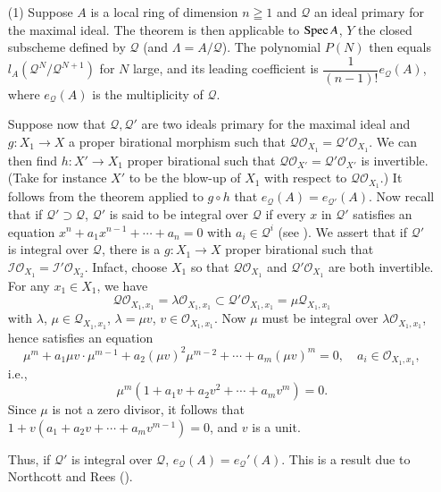 \begin{remarks*}
\begin{itemize}
\item[(1)] Suppose $A$ is a local ring of dimension $n \geqq 1$ and $\mathscr{Q}$ an ideal primary for the maximal ideal. The theorem is then applicable to $\operatorname{Spec} A$, $Y$ the closed subscheme defined by $\mathscr{Q}$ (and $\Lambda = A / \mathscr{Q}$). The polynomial $P(N)$ then equals $l_A (\mathscr{Q}^N / \mathscr{Q}^{N+1})$ for $N$ large, and its leading coefficient is $\dfrac{1}{(n-1)!} e_{\mathscr{Q}} (A)$, where $e_\mathscr{Q}(A)$ is the multiplicity of $\mathscr{Q}$.

Suppose now that $\mathscr{Q}, \mathscr{Q}'$ are two ideals primary for the maximal ideal and $g: X_1 \to X$ a proper birational morphism such that $\mathscr{Q}\mathscr{O}_{X_1} = \mathscr{Q}' \mathscr{O}_{X_1}$. We can then find $h: X' \to X_1$ proper birational such that $\mathscr{Q} \mathscr{O}_{X'} = \mathscr{Q}' \mathscr{O}_{X'}$ is invertible. (Take for instance $X'$ to be the blow-up of $X_1$ with respect to $\mathscr{Q} \mathscr{O}_{X_1}$.) It follows from the theorem applied to $g \circ h$ that $e_\mathscr{Q} (A) = e_{\mathscr{Q}'} (A)$. Now recall that if $\mathscr{Q}' \supset \mathscr{Q}$, $\mathscr{Q}'$ is said to be integral over $\mathscr{Q}$ if every $x$ in $\mathscr{Q}'$ satisfies an equation $x^n + a_1 x^{n-1} + \cdots + a_n = 0$ with $a_i \in \mathscr{Q}^i$ (see \cite{art11-key3}). We assert that if $\mathscr{Q}'$ is integral over $\mathscr{Q}$, there is a $g: X_1 \to X$ proper birational such that $\mathscr{I}\mathscr{O}_{X_1}=\mathscr{I'}\mathscr{O}_{X_2}$. Infact, choose $X_1$ so that $\mathscr{Q}\mathscr{O}_{X_1}$ and  $\mathscr{Q}' \mathscr{O}_{X_1}$ are both invertible. For any $x_1\in X_1$, we have
$$
\mathscr{Q} \mathscr{O}_{X_1, x_1} = \lambda \mathscr{O}_{X_1, x_1} \subset \mathscr{Q}' \mathscr{O}_{X_1, x_1} = \mu \mathscr{Q}_{X_1, x_1}
$$
with $\lambda$, $\mu \in \mathscr{Q}_{X_1, x_1}$, $\lambda = \mu v$, $v \in \mathscr{O}_{X_1, x_1}$. Now $\mu$ must be integral over $\lambda \mathscr{O}_{X_1,x_1}$, hence satisfies an equation
$$
\mu^m + a_1 \mu v \cdot \mu^{m-1} + a_2 (\mu v)^2 \mu^{m-2} + \cdots + a_m (\mu v)^m = 0, \quad a_i\in \mathscr{O}_{X_1, x_1},
$$
i.e.,
$$
\mu^m (1 + a_1 v + a_2 v^2 + \cdots + a_m v^m) =0.
$$
Since $\mu$ is not a zero divisor, it follows that $1+ v (a_1 + a_2 v + \cdots + a_m v^{m-1}) = 0$, and $v$ is  a unit. 

Thus, if $\mathscr{Q}'$ is integral over $\mathscr{Q}$, $e_\mathscr{Q}(A) = e_\mathscr{Q}'(A)$. This is a result due to Northcott and Rees (\cite{art11-key4}).


\end{itemize}
\end{remarks*}
